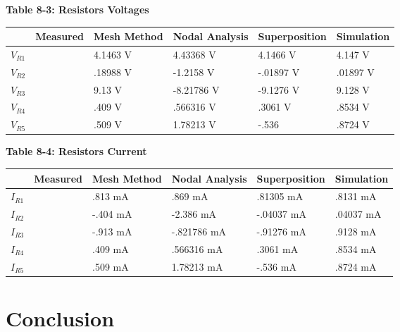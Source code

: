 \documentclass[a4paper]{article}
\begin{document}
\begin{center}
    \small\textbf{Table 8-3: Resistors Voltages \cite{UNCC-ECE-Dept:2023}}
    \begin{tabular}{|p{2 cm}|p{2cm}|p{2 cm}|p{2 cm}|p{2 cm}|p{2 cm}|}
        \hline
         & Measured & Mesh Method & Nodal Analysis & Superposition & Simulation \\
        \hline
        $V_{R1}$ & & 4.1463 V & 4.43368 V & 4.1466 V & 4.147 V \\
        \hline
        $V_{R2}$ & & .18988 V & -1.2158 V & -.01897 V & .01897 V \\
        \hline
        $V_{R3}$ & & 9.13 V & -8.21786 V & -9.1276 V & 9.128 V \\
        \hline
        $V_{R4}$ & & .409 V & .566316 V & .3061 V & .8534 V \\
        \hline
        $V_{R5}$ & & .509 V & 1.78213 V & -.536& .8724 V \\
        \hline
    \end{tabular}
\end{center}

\begin{center}
    \small\textbf{Table 8-4: Resistors Current \cite{UNCC-ECE-Dept:2023}}
    \begin{tabular}{|p{2 cm}|p{2cm}|p{2 cm}|p{2 cm}|p{2 cm}|p{2 cm}|}
        \hline
         & Measured & Mesh Method & Nodal Analysis & Superposition & Simulation \\
        \hline
        $I_{R1}$ &  & .813 mA & .869 mA & .81305 mA &.8131 mA \\
        \hline
        $I_{R2}$ & & -.404 mA & -2.386 mA & -.04037 mA  & .04037 mA\\
        \hline
        $I_{R3}$ & & -.913 mA & -.821786 mA & -.91276 mA & .9128 mA \\
        \hline
        $I_{R4}$ & & .409 mA & .566316 mA &  .3061 mA & .8534 mA\\
        \hline
        $I_{R5}$ & & .509 mA & 1.78213 mA & -.536 mA & .8724 mA\\
        \hline
    \end{tabular}
\end{center}

\section{Conclusion}





\end{document}
